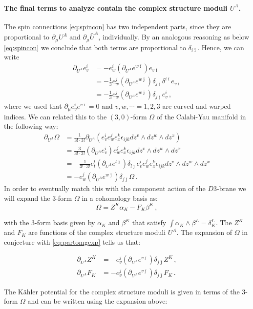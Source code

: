 \documentclass[12pt]{report}
\newcommand{\be}{\begin{equation}}
\newcommand{\ee}{\end{equation}}
\newcommand{\bea}{\begin{equation}\begin{aligned}}
\newcommand{\eea}{\end{aligned}\end{equation}}
\def\ib{{\bar \imath}}
\def\jb{{\bar \jmath}}
\begin{document}
\paragraph{The final terms to analyze contain the complex structure moduli $U^A$.} The spin connections \eqref{eq:spincon} has two independent parts, since they are proportional to $\partial_\mu U^A$ and $\partial_\mu \bar{U}^A$, individually. By an analogous reasoning as below \eqref{eq:spincon} we conclude that both terms are proportional to $\delta_{i\ib}$. Hence,  we can write
\bea
\partial_{U^A} e^i_v 
&= - e^i_{w} (\partial_{U^A} e^{w\ib} ) e_{v\ib}\\
&= -\frac{1}{3} e^j_w (\partial_{U^A} e^{w\jb} ) \delta_{j\jb} \delta^{i\ib} e_{v\ib}\\
&= -\frac{1}{3} e^j_w (\partial_{U^A} e^{w\jb} ) \delta_{j\jb}  e^i_{v}\,,
\eea
where we used that $\partial_\mu e^i_v e^{v\ib} = 0$ and $v,w,\cdots = 1,2,3$ are curved and warped indices. We can related this to the $(3,0)$-form $\Omega$ of the Calabi-Yau manifold in the following way:
\bea
\partial_{U^A} \Omega &= \frac{1}{3! \cdot 3!} \partial_{U^A} \left( e^i_v e^j_w e^k_x \epsilon_{ijk} dz^v \wedge dz^w \wedge dz^x\right)\\
&= \frac{3}{3! \cdot 3!} \left(\partial_{U^A}  e^i_v\right) e^j_w e^k_x \epsilon_{ijk} dz^v \wedge dz^w \wedge dz^x\\
&= - \frac{1}{3! \cdot 3!} e^l_t \left(\partial_{U^A} e^{t\jb}\right) \delta_{l\jb} e^i_v e^j_w e^k_x \epsilon_{ijk} dz^v \wedge dz^w \wedge dz^x\\
&= -e^j_w \left(\partial_{U^A} e^{w\jb} \right) \delta_{j\jb} \Omega\,.
\label{eq:partomgexp}
\eea
In order to eventually match this with the component action of the $D3$-brane we will expand the 3-form $\Omega$ in a cohomology basis as:
\be 
\Omega = Z^K \alpha_K - F_K \beta^K\,,
\ee

with the 3-form basis given by $\alpha_K$ and $\beta^K$ that satisfy $\int \alpha_K \wedge \beta^L = \delta^L_K$. The $Z^K$ and $F_K$ are functions of the complex structure moduli $U^A$. The expansion of $\Omega$ in conjecture with \eqref{eq:partomgexp} tells us that:

\bea 
\partial_{U^A} Z^K &= - e^j_v \left(\partial_{U^A} e^{v\jb} \right) \delta_{j\jb} Z^K\,,\\
\partial_{U^A} F_K &= -e^j_v \left(\partial_{U^A} e^{v\jb}\right) \delta_{j\jb} F_K\,.
\eea

The Kähler potential for the complex structure moduli is given in terms of the 3-form $\Omega$ and can be written using the expansion above:
\end{document}
